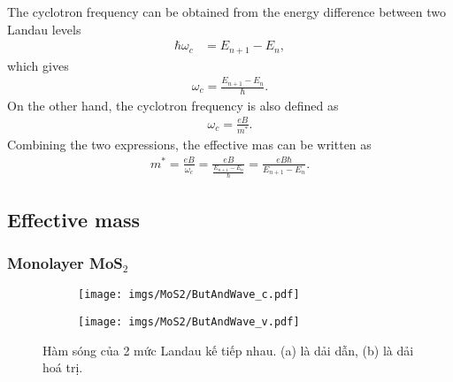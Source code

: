 \documentclass{article}
\begin{document}
%
%

The cyclotron frequency can be obtained from the energy difference between two Landau levels
\begin{equation}
	\begin{aligned}
		\hbar \omega_{c}       & = E_{n+1} - E_{n}  ,
	\end{aligned}
\end{equation}
which gives
\begin{gather}
	\omega_{c}  = \frac{E_{n+1} - E_{n}}{\hbar}.
\end{gather}
On the other hand, the cyclotron frequency is also defined as
\begin{gather}
	\omega_{c}         = \frac{eB}{m^{*}}.
\end{gather}
Combining the two expressions, the effective mas can be written as 
\begin{gather}
	m^{*}  =  \frac{eB}{\omega_{c}} = \frac{eB}{\frac{E_{n+1} - E_{n}}{\hbar}} = \frac{eB \hbar}{E_{n+1} - E_{n}}.
\end{gather}


\newpage
\subsection{Effective mass}
\subsubsection*{Monolayer MoS$_{2}$}

\begin{figure}[htb]
	\begin{subfigure}{0.495\textwidth}
		\centering
		\texttt{[image: imgs/MoS2/ButAndWave\_c.pdf]}
	\end{subfigure}
	\begin{subfigure}{0.495\textwidth}
		\centering
		\texttt{[image: imgs/MoS2/ButAndWave\_v.pdf]}
	\end{subfigure}
	\caption{Hàm sóng của 2 mức Landau kế tiếp nhau. (a) là dải dẫn, (b) là dải hoá trị.}
\end{figure}
\end{document}
